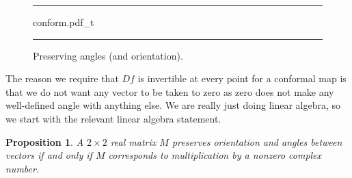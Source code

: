 \documentclass[12pt,openany]{book}
\theoremstyle{plain}
\newtheorem{prop}[thm]{Proposition}
\theoremstyle{remark}
\theoremstyle{definition}
\newenvironment{myfig}{%
\begin{figure}[h!t]
\noindent\rule{\textwidth}{0.5pt}\vspace{12pt}\par\centering}%
{\par\noindent\rule{\textwidth}{0.5pt}
\end{figure}}
\theoremstyle{exercise}
\theoremstyle{example}
\begin{document}
\begin{myfig}
{conform.pdf_t}
\caption{Preserving angles (and orientation).\label{fig:conform}}
\end{myfig}

The reason we require that $Df$ is invertible at every point
for a conformal map is that we do not want any vector
to be taken to zero
as zero does not make any well-defined angle with anything else.
We are really just doing linear algebra, so we start with the relevant
linear algebra statement.

\begin{prop}
A $2\times 2$ real matrix $M$
preserves orientation and angles
between vectors
if and only if $M$ corresponds to multiplication by a nonzero
complex number.
\end{prop}
\end{document}
